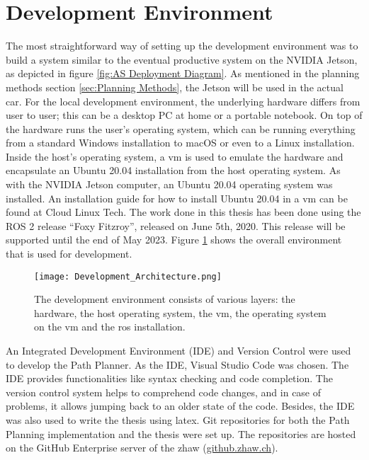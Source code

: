 \section{Development Environment} \label{sec:Development Environment}
The most straightforward way of setting up the development environment was to build a system similar to the eventual productive system on the NVIDIA Jetson, as depicted in figure \ref{fig:AS Deployment Diagram}.
As mentioned in the planning methods section \ref{sec:Planning Methods}, the Jetson will be used in the actual car.
For the local development environment, the underlying hardware differs from user to user; this can be a desktop PC at home or a portable notebook. On top of the hardware runs the user's operating system, which can be running everything from a standard Windows installation to macOS or even to a Linux installation. Inside the host's operating system, a \acrlong{vm} is used to emulate the hardware and encapsulate an Ubuntu 20.04 installation from the host operating system. As with the NVIDIA Jetson computer, an Ubuntu 20.04 operating system was installed. An installation guide for how to install Ubuntu 20.04 in a \acrshort{vm} can be found at Cloud Linux Tech. \cite{cloudlinuxtech_install_ubuntu_2004} The work done in this thesis has been done using the ROS 2 release ``Foxy Fitzroy'', released on June 5th, 2020. This release will be supported until the end of May 2023. \cite{ros2_releases_and_target_platforms}
Figure \ref{fig:Development Environment} shows the overall environment that is used for development.
\begin{figure}[H]
    \centering
    \texttt{[image: Development\_Architecture.png]}
    \caption{The development environment consists of various layers: the hardware, the host operating system, the \acrshort{vm}, the operating system on the \acrshort{vm} and the \acrshort{ros} installation.}
    \label{fig:Development Environment}
\end{figure}

An Integrated Development Environment (IDE) and Version Control were used to develop the Path Planner. As the IDE, Visual Studio Code was chosen. The IDE provides functionalities like syntax checking and code completion. The version control system helps to comprehend code changes, and in case of problems, it allows jumping back to an older state of the code. Besides, the IDE was also used to write the thesis using \Gls{latex}. Git repositories for both the Path Planning implementation and the thesis were set up. The repositories are hosted on the GitHub Enterprise server of the \acrshort{zhaw} (\href{https://github.zhaw.ch}{github.zhaw.ch}).

